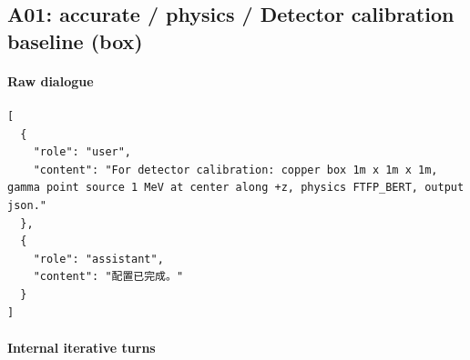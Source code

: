 \documentclass[11pt]{article}
\begin{document}
\subsection{A01: accurate / physics / Detector calibration baseline (box)}
\paragraph{Raw dialogue}
\begin{lstlisting}
[
  {
    "role": "user",
    "content": "For detector calibration: copper box 1m x 1m x 1m, gamma point source 1 MeV at center along +z, physics FTFP_BERT, output json."
  },
  {
    "role": "assistant",
    "content": "配置已完成。"
  }
]
\end{lstlisting}
\paragraph{Internal iterative turns}
\end{document}
